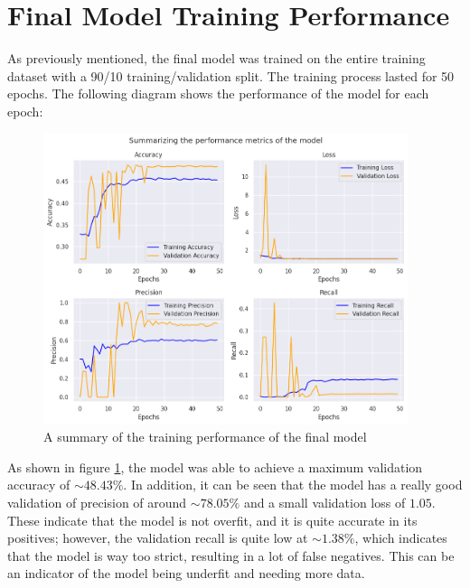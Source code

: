 \documentclass[rgb,listoffigures,listoftables,final]{cam-thesis}
\begin{document}
    \section{Final Model Training Performance}
    As previously mentioned, the final model was trained on the entire training dataset with a 90/10 training/validation split. The training process lasted for 50 epochs. The following diagram shows the performance of the model for each epoch:
    \begin{figure}[H]
        \centering
        \includegraphics[width=0.95\textwidth]{figures/model_performance.png}
        \caption{A summary of the training performance of the final model}
        \label{fig:model-performance}
    \end{figure}

    As shown in figure \ref{fig:model-performance}, the model was able to achieve a maximum validation accuracy of $\sim 48.43\%$. In addition, it can be seen that the model has a really good validation of precision of around $\sim 78.05\%$ and a small validation loss of $1.05$. These indicate that the model is not overfit, and it is quite accurate in its positives; however, the validation recall is quite low at $\sim 1.38\%$, which indicates that the model is way too strict, resulting in a lot of false negatives. This can be an indicator of the model being underfit and needing more data.
    
\end{document}
